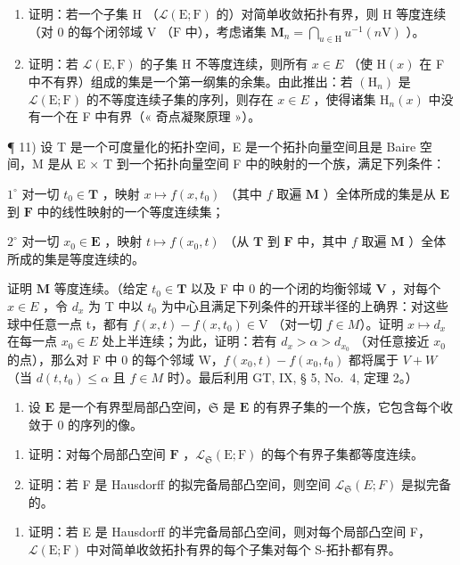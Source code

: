 \begin{enumerate}
\def\labelenumi{\alph{enumi})}
\item
  证明：若一个子集 \(\mathrm{H}\) （\(\mathcal{L}(\mathrm{E};\mathrm{F})\) 的）对简单收敛拓扑有界，则 \(\mathrm{H}\) 等度连续（对 0 的每个闭邻域 \(\mathrm{V}\) （\(\mathrm{F}\) 中），考虑诸集 \(\mathbf{M}_n = \bigcap_{u\in \mathrm{H}}u^{-1}(n\mathrm{V})\) ）。
\item
  证明：若 \(\mathcal{L}(\mathrm{E},\mathrm{F})\) 的子集 H 不等度连续，则所有 \(x\in E\) （使 \(\mathrm{H}(x)\) 在 F 中不有界）组成的集是一个第一纲集的余集。由此推出：若 \((\mathrm{H}_{n})\) 是 \(\mathcal{L}(\mathrm{E};\mathrm{F})\) 的不等度连续子集的序列，则存在 \(x\in E\) ，使得诸集 \(\mathrm{H}_{n}(x)\) 中没有一个在 F 中有界（« 奇点凝聚原理 »）。
\end{enumerate}

¶ 11) 设 T 是一个可度量化的拓扑空间，E 是一个拓扑向量空间且是 Baire 空间，M 是从 E × T 到一个拓扑向量空间 F 中的映射的一个族，满足下列条件：

\(1^{\circ}\) 对一切 \(t_0 \in \mathbf{T}\) ，映射 \(x \mapsto f(x, t_0)\) （其中 \(f\) 取遍 \(\mathbf{M}\) ）全体所成的集是从 \(\mathbf{E}\) 到 \(\mathbf{F}\) 中的线性映射的一个等度连续集；

\(2^{\circ}\) 对一切 \(x_0 \in \mathbf{E}\) ，映射 \(t \mapsto f(x_0, t)\) （从 \(\mathbf{T}\) 到 \(\mathbf{F}\) 中，其中 \(f\) 取遍 \(\mathbf{M}\) ）全体所成的集是等度连续的。

证明 \(\mathbf{M}\) 等度连续。（给定 \(t_0 \in \mathbf{T}\) 以及 F 中 0 的一个闭的均衡邻域 \(\mathbf{V}\) ，对每个 \(x \in E\) ，令 \(d_{x}\) 为 T 中以 \(t_{0}\) 为中心且满足下列条件的开球半径的上确界：对这些球中任意一点 t，都有 \(f(x, t) - f(x, t_{0}) \in \mathrm{V}\) （对一切 \(f \in M\)）。证明 \(x \mapsto d_{x}\) 在每一点 \(x_{0} \in E\) 处上半连续；为此，证明：若有 \(d_{x} > \alpha > d_{x_{0}}\) （对任意接近 \(x_{0}\) 的点），那么对 F 中 0 的每个邻域 W，\(f(x_{0}, t) - f(x_{0}, t_{0})\) 都将属于 \(V + W\) （当 \(d(t, t_{0}) \leqslant \alpha\) 且 \(f \in M\) 时）。最后利用 GT, IX, § 5, No.~4, 定理 2。）

\begin{enumerate}
\def\labelenumi{\arabic{enumi})}
\setcounter{enumi}{11}
\tightlist
\item
  设 \(\mathbf{E}\) 是一个有界型局部凸空间，\(\mathfrak{S}\) 是 \(\mathbf{E}\) 的有界子集的一个族，它包含每个收敛于 0 的序列的像。
\end{enumerate}

\begin{enumerate}
\def\labelenumi{\alph{enumi})}
\item
  证明：对每个局部凸空间 \(\mathbf{F}\) ，\(\mathcal{L}_{\mathfrak{S}}(\mathrm{E};\mathrm{F})\) 的每个有界子集都等度连续。
\item
  证明：若 F 是 Hausdorff 的拟完备局部凸空间，则空间 \(\mathcal{L}_{\mathfrak{S}}(E;F)\) 是拟完备的。
\end{enumerate}

\begin{enumerate}
\def\labelenumi{\arabic{enumi})}
\setcounter{enumi}{12}
\tightlist
\item
  证明：若 E 是 Hausdorff 的半完备局部凸空间，则对每个局部凸空间 F，\(\mathcal{L}(\mathrm{E};\mathrm{F})\) 中对简单收敛拓扑有界的每个子集对每个 S-拓扑都有界。
\end{enumerate}

